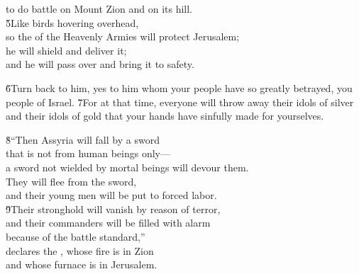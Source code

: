 \begin{poetry}
\poemll    to do battle on Mount Zion and on its hill. \\
\poeml \v{5}Like birds hovering overhead, \\
\poemll    so the  of the Heavenly Armies will protect Jerusalem; \\
\poeml he will shield and deliver it; \\
\poemll    and he will pass over and bring it to safety.
\end{poetry}

\v{6}Turn back to him, yes to him whom your people have so greatly betrayed, you people of Israel. \v{7}For at that time, everyone will throw away their idols of silver and their idols of gold that your hands have sinfully made for yourselves.

\begin{poetry}
\poeml \v{8}``Then Assyria will fall by a sword \\
\poemll    that is not from human beings only--- \\
\poemlll       a sword not wielded by mortal beings will devour them. \\
\poeml They will flee from the sword, \\
\poemll    and their young men will be put to forced labor. \\
\poeml \v{9}Their stronghold will vanish by reason of terror, \\
\poemll    and their commanders will be filled with alarm \\
\poemlll       because of the battle standard,'' \\
\poeml declares the , whose fire is in Zion \\
\poemll    and whose furnace is in Jerusalem.
\end{poetry}

